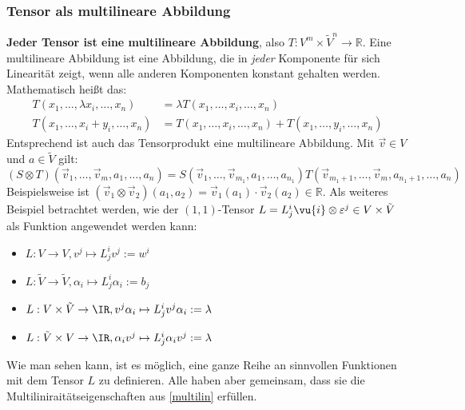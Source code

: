 	\subsubsection{Tensor als multilineare Abbildung}
	\textbf{Jeder Tensor ist eine multilineare Abbildung}, also $T: V^{ m}\times \tilde{V}^n\to \mathbb{R}$. Eine multilineare Abbildung ist eine Abbildung, die in \textit{jeder} Komponente für sich Linearität zeigt, wenn alle anderen Komponenten konstant gehalten werden. Mathematisch heißt das:
	\begin{equation}\label{multilin}\begin{split}
			T(x_1,\dots, \lambda x_i,\dots,x_n)&=\lambda T(x_1,\dots,x_i,\dots,x_n)\\
			T(x_1,\dots, x_i+y_i,\dots,x_n)&=T(x_1,\dots,x_i,\dots,x_n)+T(x_1,\dots,y_i,\dots,x_n)
	\end{split}\end{equation}
	Entsprechend ist auch das Tensorprodukt eine multilineare Abbildung. Mit $\vec{v}\in V$ und $a\in \tilde{V}$ gilt:
	\begin{equation}\label{tensorprod}
		(S\otimes T)(\vec{v}_1,\dots,\vec{v}_m,a_1,\dots,a_n)=S(\vec{v}_1,\dots,\vec{v}_{m_1}, a_1,\dots,a_{n_1})T(\vec{v}_{m_1+1},\dots,\vec{v}_m,a_{n_1+1},\dots,a_n)
	\end{equation}
	Beispielsweise ist $(\vec{v}_1\otimes\vec{v}_2)(a_1,a_2)=\vec{v}_1(a_1)\cdot\vec{v}_2(a_2)\in\mathbb{R}$. Als weiteres Beispiel betrachtet werden, wie der $(1,1)$-Tensor $L=L^i_j \vu{i}\otimes\varepsilon^j\in V\times \tilde{V}$ als Funktion angewendet werden kann:
	\begin{itemize}
		\item $L: V \to V, v^j \mapsto L^i_j v^j := w^i $ 
		\item $L: \tilde{V} \to \tilde{V}, \alpha_i \mapsto L^i_j \alpha_i := b_j$
		\item $L: V\times\tilde{V} \to \IR, v^j\alpha_i \mapsto L^i_j v^j\alpha_i := \lambda$
		\item $L: \tilde{V}\times V \to \IR, \alpha_iv^j \mapsto L^i_j \alpha_iv^j := \lambda$
	\end{itemize}
	Wie man sehen kann, ist es möglich, eine ganze Reihe an sinnvollen Funktionen mit dem Tensor $L$ zu definieren. Alle haben aber gemeinsam, dass sie die Multiliniraitätseigenschaften aus \ref{multilin} erfüllen.
